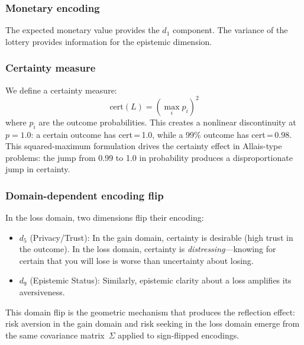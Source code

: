 \documentclass[journal]{IEEEtran}
\begin{document}
\subsubsection{Monetary encoding}
The expected monetary value provides the $d_1$ component.
The variance of the lottery provides information for the epistemic dimension.

\subsubsection{Certainty measure}
We define a certainty measure:
\begin{equation}
    \text{cert}(L) = \left(\max_i p_i\right)^2
    \label{eq:certainty}
\end{equation}
where $p_i$ are the outcome probabilities.
This creates a nonlinear discontinuity at $p = 1.0$: a certain outcome has cert\,=\,1.0, while a 99\% outcome has cert\,=\,0.98.
This squared-maximum formulation drives the certainty effect in Allais-type problems: the jump from 0.99 to 1.0 in probability produces a disproportionate jump in certainty.

\subsubsection{Domain-dependent encoding flip}
In the loss domain, two dimensions flip their encoding:
\begin{itemize}
    \item $d_5$ (Privacy/Trust): In the gain domain, certainty is desirable (high trust in the outcome). In the loss domain, certainty is \emph{distressing}---knowing for certain that you will lose is worse than uncertainty about losing.
    \item $d_9$ (Epistemic Status): Similarly, epistemic clarity about a loss amplifies its aversiveness.
\end{itemize}
This domain flip is the geometric mechanism that produces the reflection effect: risk aversion in the gain domain and risk seeking in the loss domain emerge from the same covariance matrix~$\Sigma$ applied to sign-flipped encodings.
\end{document}
